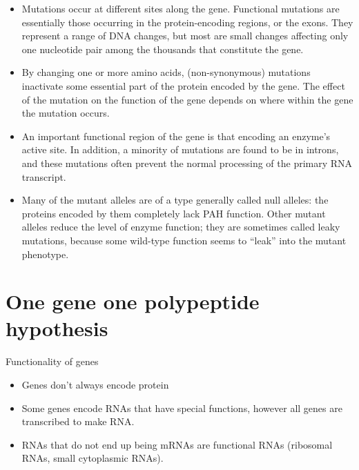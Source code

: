 \documentclass[11pt,dvipsnames,ignorenonframetext,aspectratio=169]{beamer}
\providecommand{\tightlist}{%
  \setlength{\itemsep}{0pt}\setlength{\parskip}{0pt}}
\begin{document}
\begin{frame}{}
\protect\hypertarget{section-4}{}
\begin{itemize}
\tightlist
\item
  Mutations occur at different sites along the gene. Functional
  mutations are essentially those occurring in the protein-encoding
  regions, or the exons. They represent a range of DNA changes, but most
  are small changes affecting only one nucleotide pair among the
  thousands that constitute the gene.
\item
  By changing one or more amino acids, (non-synonymous) mutations
  inactivate some essential part of the protein encoded by the gene. The
  effect of the mutation on the function of the gene depends on where
  within the gene the mutation occurs.
\end{itemize}
\end{frame}

\begin{frame}{}
\protect\hypertarget{section-5}{}
\begin{itemize}
\tightlist
\item
  An important functional region of the gene is that encoding an
  enzyme's active site. In addition, a minority of mutations are found
  to be in introns, and these mutations often prevent the normal
  processing of the primary RNA transcript.
\item
  Many of the mutant alleles are of a type generally called null
  alleles: the proteins encoded by them completely lack PAH function.
  Other mutant alleles reduce the level of enzyme function; they are
  sometimes called leaky mutations, because some wild-type function
  seems to ``leak'' into the mutant phenotype.
\end{itemize}
\end{frame}

\hypertarget{one-gene-one-polypeptide-hypothesis}{%
\section{One gene one polypeptide
hypothesis}\label{one-gene-one-polypeptide-hypothesis}}

\begin{frame}{Functionality of genes}
\protect\hypertarget{functionality-of-genes}{}
\begin{itemize}
\tightlist
\item
  Genes don't always encode protein
\item
  Some genes encode RNAs that have special functions, however all genes
  are transcribed to make RNA.
\item
  RNAs that do not end up being mRNAs are functional RNAs (ribosomal
  RNAs, small cytoplasmic RNAs).
\end{itemize}
\end{frame}
\end{document}

